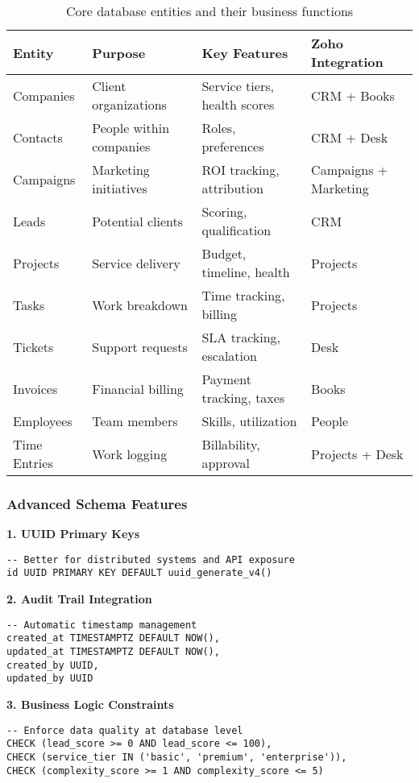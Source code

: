\begin{table}[h]
\centering
\begin{tabular}{|l|l|l|l|}
\hline
\textbf{Entity} & \textbf{Purpose} & \textbf{Key Features} & \textbf{Zoho Integration} \\
\hline
Companies & Client organizations & Service tiers, health scores & CRM + Books \\
\hline
Contacts & People within companies & Roles, preferences & CRM + Desk \\
\hline
Campaigns & Marketing initiatives & ROI tracking, attribution & Campaigns + Marketing \\
\hline
Leads & Potential clients & Scoring, qualification & CRM \\
\hline
Projects & Service delivery & Budget, timeline, health & Projects \\
\hline
Tasks & Work breakdown & Time tracking, billing & Projects \\
\hline
Tickets & Support requests & SLA tracking, escalation & Desk \\
\hline
Invoices & Financial billing & Payment tracking, taxes & Books \\
\hline
Employees & Team members & Skills, utilization & People \\
\hline
Time Entries & Work logging & Billability, approval & Projects + Desk \\
\hline
\end{tabular}
\caption{Core database entities and their business functions}
\end{table}

\subsubsection{Advanced Schema Features}

\textbf{1. UUID Primary Keys}
\begin{verbatim}
-- Better for distributed systems and API exposure
id UUID PRIMARY KEY DEFAULT uuid_generate_v4()
\end{verbatim}

\textbf{2. Audit Trail Integration}
\begin{verbatim}
-- Automatic timestamp management
created_at TIMESTAMPTZ DEFAULT NOW(),
updated_at TIMESTAMPTZ DEFAULT NOW(),
created_by UUID,
updated_by UUID
\end{verbatim}

\textbf{3. Business Logic Constraints}
\begin{verbatim}
-- Enforce data quality at database level
CHECK (lead_score >= 0 AND lead_score <= 100),
CHECK (service_tier IN ('basic', 'premium', 'enterprise')),
CHECK (complexity_score >= 1 AND complexity_score <= 5)
\end{verbatim}

